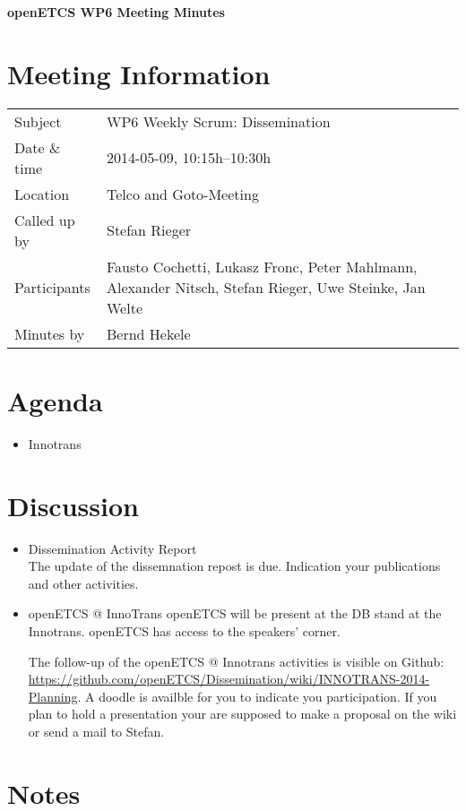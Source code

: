 \documentclass[a4paper, 11pt]{article}
\begin{document}
{\begin{center}\huge\bf openETCS WP6 Meeting Minutes\end{center}}
\section{Meeting Information}

\renewcommand{\arraystretch}{1.5}
\begin{supertabular}{m{.2\textwidth}m{.8\textwidth}}
Subject & WP6 Weekly Scrum: Dissemination\\
Date \& time & 2014-05-09, 10:15h--10:30h\\
Location & Telco and Goto-Meeting\\
Called up by & Stefan Rieger\\
Participants &
Fausto Cochetti,
Lukasz Fronc,
Peter Mahlmann,
Alexander Nitsch,
Stefan Rieger,
Uwe Steinke,
Jan Welte
\\

Minutes by & Bernd Hekele\\

\end{supertabular}
\renewcommand{\arraystretch}{1.0}


\section{Agenda}
\begin{itemize}

\item Innotrans

\end{itemize}

\section{Discussion}

\begin{itemize}
\item Dissemination Activity Report\\
The update of the dissemnation repost is due. Indication your publications and other activities.
 
\item openETCS @ InnoTrans
openETCS will be present at the DB stand at the Innotrans. openETCS has access to the speakers' corner.

The follow-up of the openETCS @ Innotrans activities is visible on Github:
\url{https://github.com/openETCS/Dissemination/wiki/INNOTRANS-2014-Planning}. A doodle is availble for you to indicate you participation. If you plan to hold a presentation your are supposed to make a proposal on the wiki or send a mail to Stefan.

\end{itemize}

\section{Notes}
\end{document}
